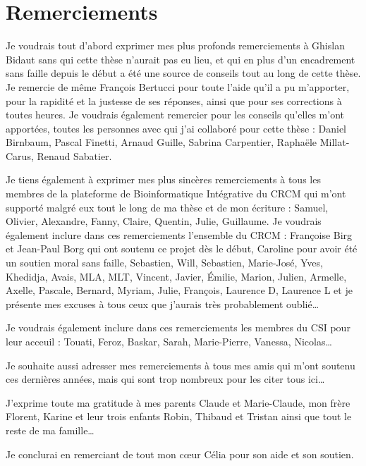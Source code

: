 \chapter*{Remerciements}

\noindent{}Je voudrais tout d'abord exprimer mes plus profonds remerciements à Ghislan Bidaut sans qui cette thèse n'aurait pas eu lieu, et qui en plus d'un encadrement sans faille depuis le début a été une source de conseils tout au long de cette thèse. Je remercie de même François Bertucci pour toute l'aide qu'il a pu m'apporter, pour la rapidité et la justesse de ses réponses, ainsi que pour ses corrections à toutes heures. Je voudrais également remercier pour les conseils qu'elles m'ont apportées, toutes les personnes avec qui j'ai collaboré pour cette thèse : Daniel Birnbaum, Pascal Finetti, Arnaud Guille, Sabrina Carpentier, Raphaële Millat-Carus, Renaud Sabatier.
\vspace{.5cm}

\noindent{}Je tiens également à exprimer mes plus sincères remerciements à tous les membres de la plateforme de Bioinformatique Intégrative du \acs{CRCM} qui m'ont supporté malgré eux tout le long de ma thèse et de mon écriture : Samuel, Olivier, Alexandre, Fanny, Claire, Quentin, Julie, Guillaume. Je voudrais également inclure dans ces remerciements l'ensemble du CRCM : Françoise Birg et Jean-Paul Borg qui ont soutenu ce projet dès le début, Caroline pour avoir été un soutien moral sans faille, Sebastien, Will, Sebastien, Marie-José, Yves, Khedidja, Avais, MLA, MLT, Vincent, Javier, Émilie, Marion, Julien, Armelle, Axelle, Pascale, Bernard, Myriam, Julie, François, Laurence D, Laurence L et je présente mes excuses à tous ceux que j'aurais très probablement oublié\dots
\vspace{.5cm}

\noindent{}Je voudrais également inclure dans ces remerciements les membres du \acs{CSI} pour leur acceuil : Touati, Feroz, Baskar, Sarah, Marie-Pierre, Vanessa, Nicolas\dots
\vspace{.5cm}

\noindent{}Je souhaite aussi adresser mes remerciements à tous mes amis qui m'ont soutenu ces dernières années, mais qui sont trop nombreux pour les citer tous ici\dots
\vspace{.5cm}

\noindent{}J'exprime toute ma gratitude à mes parents Claude et Marie-Claude, mon frère Florent, Karine et leur trois enfants Robin, Thibaud et Tristan ainsi que tout le reste de ma famille\dots
\vspace{.5cm}

\noindent{}Je conclurai en remerciant de tout mon c{\oe}ur Célia pour son aide et son soutien.